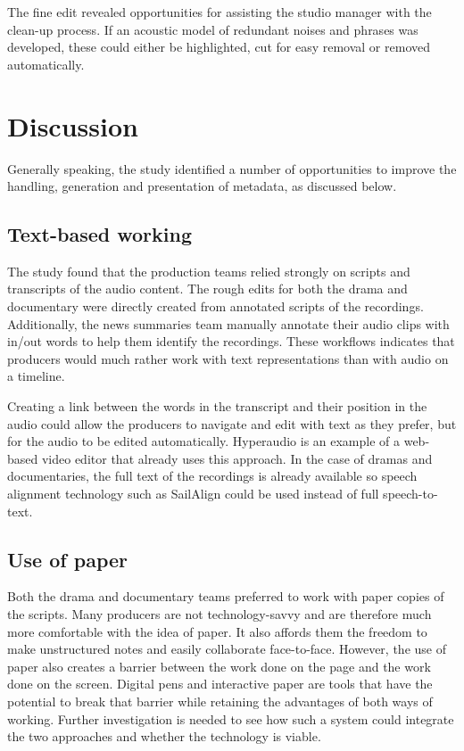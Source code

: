 The fine edit revealed opportunities for assisting the studio manager with the clean-up process. If an acoustic model
of redundant noises and phrases was developed, these could either be highlighted, cut for easy removal or removed
automatically.

\section{Discussion}\label{sec:ethno-discussion}
Generally speaking, the study identified a number of opportunities to improve the handling, generation and presentation
of metadata, as discussed below.

\subsection{Text-based working}
The study found that the production teams relied strongly on scripts and transcripts of the audio content. The rough
edits for both the drama and documentary were directly created from annotated scripts of the recordings.  Additionally,
the news summaries team manually annotate their audio clips with in/out words to help them identify the recordings.
These workflows indicates that producers would much rather work with text representations than with audio on a
timeline.

Creating a link between the words in the transcript and their position in the audio could allow the producers to
navigate and edit with text as they prefer, but for the audio to be edited automatically. Hyperaudio \citep{Boas2011}
is an example of a web-based video editor that already uses this approach. In the case of dramas and documentaries, the
full text of the recordings is already available so speech alignment technology such as SailAlign
\citep{Katsamanis2011} could be used instead of full speech-to-text.

\subsection{Use of paper}
Both the drama and documentary teams preferred to work with paper copies of the scripts. Many producers are not
technology-savvy and are therefore much more comfortable with the idea of paper. It also affords them the freedom to
make unstructured notes and easily collaborate face-to-face. However, the use of paper also creates a barrier between
the work done on the page and the work done on the screen. Digital pens and interactive paper are tools that have the
potential to break that barrier while retaining the advantages of both ways of working. Further investigation is needed
to see how such a system could integrate the two approaches and whether the technology is viable.


